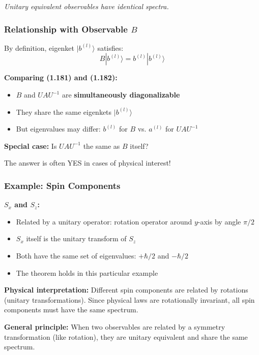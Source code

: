 \documentclass[11pt,a4paper]{article}
\begin{document}
\begin{center}
\textit{Unitary equivalent observables have identical spectra.}
\end{center}

\subsubsection{Relationship with Observable $B$}

By definition, eigenket $|b^{(l)}\rangle$ satisfies:
\begin{equation}
B|b^{(l)}\rangle = b^{(l)}|b^{(l)}\rangle
\tag{1.182}
\end{equation}

\textbf{Comparing (1.181) and (1.182):}
\begin{itemize}
\item $B$ and $UAU^{-1}$ are \textbf{simultaneously diagonalizable}
\item They share the same eigenkets $|b^{(l)}\rangle$
\item But eigenvalues may differ: $b^{(l)}$ for $B$ vs. $a^{(l)}$ for $UAU^{-1}$
\end{itemize}

\textbf{Special case:} Is $UAU^{-1}$ the same as $B$ itself?

The answer is often YES in cases of physical interest!

\subsubsection{Example: Spin Components}

\textbf{$S_x$ and $S_z$:}
\begin{itemize}
\item Related by a unitary operator: rotation operator around $y$-axis by angle $\pi/2$
\item $S_x$ itself is the unitary transform of $S_z$
\item Both have the same set of eigenvalues: $+\hbar/2$ and $-\hbar/2$
\item The theorem holds in this particular example
\end{itemize}

\textbf{Physical interpretation:}
Different spin components are related by rotations (unitary transformations). Since physical laws are rotationally invariant, all spin components must have the same spectrum.

\textbf{General principle:}
When two observables are related by a symmetry transformation (like rotation), they are unitary equivalent and share the same spectrum.
\end{document}
